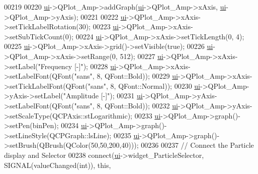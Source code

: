 \begin{DoxyCode}
{00219 
00220   \hyperlink{class_v_s_a_main_window_a958a0581d2bf1bfe020c3b5d8f738640}{ui}->QPlot\_Amp->addGraph(\hyperlink{class_v_s_a_main_window_a958a0581d2bf1bfe020c3b5d8f738640}{ui}->QPlot\_Amp->xAxis, \hyperlink{class_v_s_a_main_window_a958a0581d2bf1bfe020c3b5d8f738640}{ui}->QPlot\_Amp->yAxis);
00221 
00222   \hyperlink{class_v_s_a_main_window_a958a0581d2bf1bfe020c3b5d8f738640}{ui}->QPlot\_Amp->xAxis->setTickLabelRotation(30);
00223   \hyperlink{class_v_s_a_main_window_a958a0581d2bf1bfe020c3b5d8f738640}{ui}->QPlot\_Amp->xAxis->setSubTickCount(0);
00224   \hyperlink{class_v_s_a_main_window_a958a0581d2bf1bfe020c3b5d8f738640}{ui}->QPlot\_Amp->xAxis->setTickLength(0, 4);
00225   \hyperlink{class_v_s_a_main_window_a958a0581d2bf1bfe020c3b5d8f738640}{ui}->QPlot\_Amp->xAxis->grid()->setVisible(\textcolor{keyword}{true});
00226   \hyperlink{class_v_s_a_main_window_a958a0581d2bf1bfe020c3b5d8f738640}{ui}->QPlot\_Amp->xAxis->setRange(0, 512);
00227   \hyperlink{class_v_s_a_main_window_a958a0581d2bf1bfe020c3b5d8f738640}{ui}->QPlot\_Amp->xAxis->setLabel(\textcolor{stringliteral}{"Frequency [-]"});
00228   \hyperlink{class_v_s_a_main_window_a958a0581d2bf1bfe020c3b5d8f738640}{ui}->QPlot\_Amp->xAxis->setLabelFont(QFont(\textcolor{stringliteral}{"sans"}, 8, QFont::Bold));
00229   \hyperlink{class_v_s_a_main_window_a958a0581d2bf1bfe020c3b5d8f738640}{ui}->QPlot\_Amp->xAxis->setTickLabelFont(QFont(\textcolor{stringliteral}{"sans"}, 8, QFont::Normal));
00230   \hyperlink{class_v_s_a_main_window_a958a0581d2bf1bfe020c3b5d8f738640}{ui}->QPlot\_Amp->yAxis->setLabel(\textcolor{stringliteral}{"Amplitude [-]"});
00231   \hyperlink{class_v_s_a_main_window_a958a0581d2bf1bfe020c3b5d8f738640}{ui}->QPlot\_Amp->yAxis->setLabelFont(QFont(\textcolor{stringliteral}{"sans"}, 8, QFont::Bold));
00232   \hyperlink{class_v_s_a_main_window_a958a0581d2bf1bfe020c3b5d8f738640}{ui}->QPlot\_Amp->yAxis->setScaleType(QCPAxis::stLogarithmic);
00233   \hyperlink{class_v_s_a_main_window_a958a0581d2bf1bfe020c3b5d8f738640}{ui}->QPlot\_Amp->graph()->setPen(binPen);
00234   \hyperlink{class_v_s_a_main_window_a958a0581d2bf1bfe020c3b5d8f738640}{ui}->QPlot\_Amp->graph()->setLineStyle(QCPGraph::lsLine);
00235   \hyperlink{class_v_s_a_main_window_a958a0581d2bf1bfe020c3b5d8f738640}{ui}->QPlot\_Amp->graph()->setBrush(QBrush(QColor(50,50,200,40)));
00236 
00237   \textcolor{comment}{// Connect the Particle display and Selector}
00238   connect(\hyperlink{class_v_s_a_main_window_a958a0581d2bf1bfe020c3b5d8f738640}{ui}->widget\_ParticleSelector, SIGNAL(valueChanged(\textcolor{keywordtype}{int})), \textcolor{keyword}{this},
}
\end{DoxyCode}
